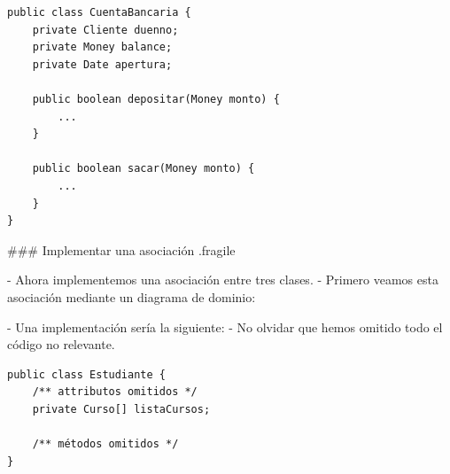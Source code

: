 \columnsend

\columnsbegin




\vspace{-1em}
\begin{lstlisting}
public class CuentaBancaria {
    private Cliente duenno;
    private Money balance;
    private Date apertura;

    public boolean depositar(Money monto) {
        ...
    }

    public boolean sacar(Money monto) {
        ...
    }
}
\end{lstlisting}

\columnsend

### Implementar una asociación {.fragile}

- Ahora implementemos una asociación entre tres clases.
- Primero veamos esta asociación mediante un diagrama de dominio:


- Una implementación sería la siguiente:
    - No olvidar que hemos omitido todo el código no relevante.

\columnsbegin


\begin{lstlisting}
public class Estudiante {
    /** attributos omitidos */
    private Curso[] listaCursos;

    /** métodos omitidos */
}
\end{lstlisting}

